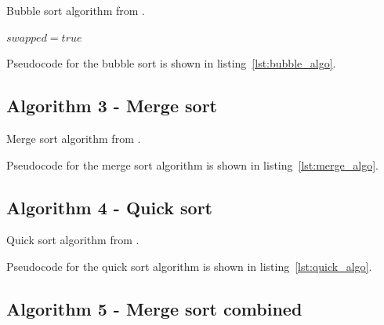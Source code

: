 \documentclass[sigconf, nonacm, natbib, screen, balance=False]{acmart}
\begin{document}
\begin{listing}
  \caption{Bubble sort algorithm from \citet[Ch.~2.1]{CLRS_2009}.}
  \label{lst:bubble_algo}
 
  \begin{codebox}
    \li $swapped = true$

  \end{codebox}
\end{listing}

Pseudocode for the bubble sort is shown in listing~\ref{lst:bubble_algo}. 

\subsection{Algorithm 3 - Merge sort}\label{sec:algo2}

\begin{listing}
  \caption{Merge sort algorithm from \citet[Ch.~2.1]{CLRS_2009}.}
  \label{lst:merge_algo}

  \begin{codebox}

  \end{codebox}
\end{listing}

Pseudocode for the merge sort algorithm is shown in listing~\ref{lst:merge_algo}. 

\subsection{Algorithm 4 - Quick sort}\label{sec:algo2}

\begin{listing}
  \caption{Quick sort algorithm from \citet[Ch.~2.1]{CLRS_2009}.}
  \label{lst:quick_algo}
  
  \begin{codebox}

  \end{codebox}
\end{listing}

Pseudocode for the quick sort algorithm is shown in 
listing~\ref{lst:quick_algo}. 

\subsection{Algorithm 5 - Merge sort combined}\label{sec:algo2}
\end{document}

